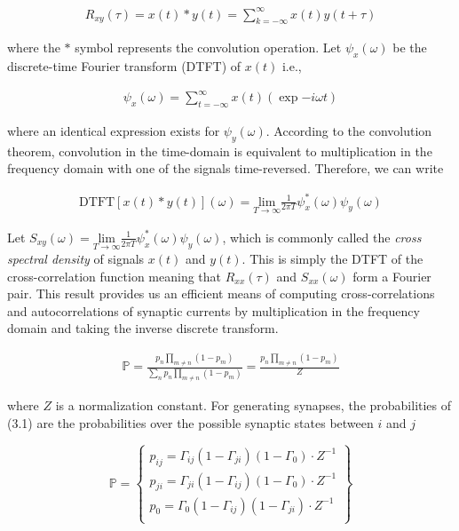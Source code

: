\documentclass{ucetd}
\begin{document}
\begin{align}
R_{xy}(\tau) = x(t) * y(t) = \sum_{k =-\infty}^{\infty}x(t)y(t+\tau)
\end{align}

where the $*$ symbol represents the convolution operation. Let $\psi_{x}(\omega)$ be the discrete-time Fourier transform (DTFT) of $x(t)$ i.e.,

\begin{align}
\psi_{x}(\omega) = \sum_{t =-\infty}^{\infty}x(t)\left(\exp{-i\omega t}\right)
\end{align}

where an identical expression exists for $\psi_{y}(\omega)$. According to the convolution theorem, convolution in the time-domain is equivalent to multiplication in the frequency domain with one of the signals time-reversed. Therefore, we can write

\begin{align}
\mathrm{DTFT}[x(t) * y(t)](\omega) = \underset{T\rightarrow\infty}{\mathrm{lim}}\frac{1}{2\pi T}\psi_{x}^{*}(\omega)\psi_{y}(\omega)
\end{align}


Let $S_{xy}(\omega) = \underset{T\rightarrow\infty}{\mathrm{lim}}\frac{1}{2\pi T}\psi_{x}^{*}(\omega)\psi_{y}(\omega)$, which is commonly called the \emph{cross spectral density} of signals $x(t)$ and $y(t)$. This is simply the DTFT of the cross-correlation function meaning that $R_{xx}(\tau)$ and $S_{xx}(\omega)$ form a Fourier pair. This result provides us an efficient means of computing cross-correlations and autocorrelations of synaptic currents by multiplication in the frequency domain and taking the inverse discrete transform.

\begin{align}
\mathbb{P} = \frac{p_{n}\prod_{m\neq n}(1-p_{m})}{\sum_{n}p_{n}\prod_{m\neq n}(1-p_{m})} = \frac{p_{n}\prod_{m\neq n}(1-p_{m})}{Z}
\end{align}

where $Z$ is a normalization constant. For generating synapses, the probabilities of (3.1) are the probabilities over the possible synaptic states between $i$ and $j$

\begin{equation}
    \mathbb{P} = \left\{\begin{array}{lr}
        p_{ij} = \Gamma_{ij}(1-\Gamma_{ji})(1-\Gamma_{0})\cdot Z^{-1}\\
        p_{ji} = \Gamma_{ji}(1-\Gamma_{ij})(1-\Gamma_{0})\cdot Z^{-1}\\
        p_{0} = \Gamma_{0}(1-\Gamma_{ij})(1-\Gamma_{ji})\cdot Z^{-1}\\
        \end{array}\right\}
\end{equation}
\end{document}
